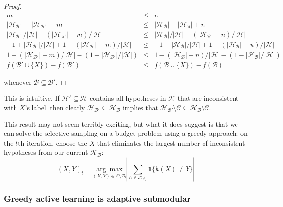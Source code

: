 \begin{proof}
\begin{eqnarray*}
m &\leq& n \\
|\mathcal{H}_{\mathcal{B}'}| - |\mathcal{H}_{\mathcal{B}'}| + m &\leq& |\mathcal{H}_{\mathcal{B}}| - |\mathcal{H}_{\mathcal{B}}| + n \\
|\mathcal{H}_{\mathcal{B}'}|/|\mathcal{H}| - (|\mathcal{H}_{\mathcal{B}'}| - m)/|\mathcal{H}| &\leq& |\mathcal{H}_{\mathcal{B}}|/|\mathcal{H}| - (|\mathcal{H}_{\mathcal{B}}| - n)/|\mathcal{H}| \\
-1 + |\mathcal{H}_{\mathcal{B}'}|/|\mathcal{H}| + 1 - (|\mathcal{H}_{\mathcal{B}'}| - m)/|\mathcal{H}| &\leq& -1 + |\mathcal{H}_{\mathcal{B}}|/|\mathcal{H}| + 1 - (|\mathcal{H}_{\mathcal{B}}| - n)/|\mathcal{H}| \\
1 - (|\mathcal{H}_{\mathcal{B}'}| - m)/|\mathcal{H}| - (1 - |\mathcal{H}_{\mathcal{B}'}|/|\mathcal{H}|) &\leq& 1 - (|\mathcal{H}_{\mathcal{B}}| - n)/|\mathcal{H}| - (1 - |\mathcal{H}_{\mathcal{B}}|/|\mathcal{H}|) \\
f(\mathcal{B}' \cup \{X\}) - f(\mathcal{B}') &\leq& f(\mathcal{B} \cup \{X\}) - f(\mathcal{B})
\end{eqnarray*}

\noindent whenever $\mathcal{B} \subseteq \mathcal{B}'$.
\end{proof}
\noindent This is intuitive. If $\mathcal{H}' \subseteq \mathcal{H}$ contains all hypotheses in $\mathcal{H}$ that are inconsistent with $X$'s label, then clearly $\mathcal{H}_{\mathcal{B}'} \subseteq \mathcal{H}_{\mathcal{B}}$ implies that $\mathcal{H}_{\mathcal{B}'} \setminus \mathcal{C} \subseteq \mathcal{H}_{\mathcal{B}} \setminus \mathcal{C}$.

This result may not seem terribly exciting, but what it does suggest is that we can solve the selective sampling on a budget problem using a greedy approach: on the $t$th iteration, choose the $X$ that eliminates the largest number of inconsistent hypotheses from our current $\mathcal{H}_{\mathcal{B}}$:
\[
(X, Y)_t = \underset{(X,Y) \in \mathcal{S} \setminus \mathcal{B}_t}{\arg\max} \left|\sum_{h \in \mathcal{H}_{\mathcal{B}_t}} \mathds{1}\{h(X) \not= Y\} \right|
\]

\subsubsection{Greedy active learning is adaptive submodular}

